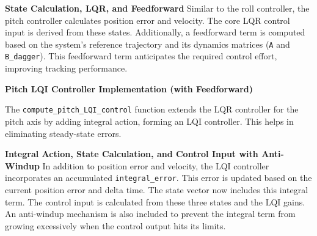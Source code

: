 \textbf{State Calculation, LQR, and Feedforward}
Similar to the roll controller, the pitch controller calculates position error and velocity. The core LQR control input is derived from these states. Additionally, a feedforward term is computed based on the system's reference trajectory and its dynamics matrices (\texttt{A} and \texttt{B\_dagger}). This feedforward term anticipates the required control effort, improving tracking performance.

\textbf{Pitch LQI Controller Implementation (with Feedforward)}

The \texttt{compute\_pitch\_LQI\_control} function extends the LQR controller for the pitch axis by adding integral action, forming an LQI controller. This helps in eliminating steady-state errors.

\textbf{Integral Action, State Calculation, and Control Input with Anti-Windup}
In addition to position error and velocity, the LQI controller incorporates an accumulated \texttt{integral\_error}. This error is updated based on the current position error and delta time. The state vector now includes this integral term. The control input is calculated from these three states and the LQI gains. An anti-windup mechanism is also included to prevent the integral term from growing excessively when the control output hits its limits.


